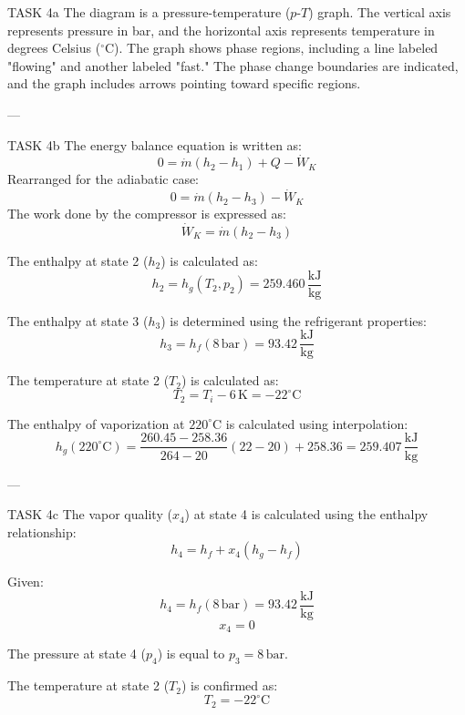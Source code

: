 TASK 4a  
The diagram is a pressure-temperature (\(p\)-\(T\)) graph. The vertical axis represents pressure in bar, and the horizontal axis represents temperature in degrees Celsius (\(^\circ\text{C}\)). The graph shows phase regions, including a line labeled "flowing" and another labeled "fast." The phase change boundaries are indicated, and the graph includes arrows pointing toward specific regions.

---

TASK 4b  
The energy balance equation is written as:  
\[
0 = \dot{m}(h_2 - h_1) + Q - \dot{W}_K
\]  
Rearranged for the adiabatic case:  
\[
0 = \dot{m}(h_2 - h_3) - \dot{W}_K
\]  
The work done by the compressor is expressed as:  
\[
\dot{W}_K = \dot{m}(h_2 - h_3)
\]  

The enthalpy at state 2 (\(h_2\)) is calculated as:  
\[
h_2 = h_g(T_2, p_2) = 259.460 \, \frac{\text{kJ}}{\text{kg}}
\]  

The enthalpy at state 3 (\(h_3\)) is determined using the refrigerant properties:  
\[
h_3 = h_f(8 \, \text{bar}) = 93.42 \, \frac{\text{kJ}}{\text{kg}}
\]  

The temperature at state 2 (\(T_2\)) is calculated as:  
\[
T_2 = T_i - 6 \, \text{K} = -22^\circ\text{C}
\]  

The enthalpy of vaporization at \(220^\circ\text{C}\) is calculated using interpolation:  
\[
h_g(220^\circ\text{C}) = \frac{260.45 - 258.36}{264 - 20} (22 - 20) + 258.36 = 259.407 \, \frac{\text{kJ}}{\text{kg}}
\]  

---

TASK 4c  
The vapor quality (\(x_4\)) at state 4 is calculated using the enthalpy relationship:  
\[
h_4 = h_f + x_4(h_g - h_f)
\]  

Given:  
\[
h_4 = h_f(8 \, \text{bar}) = 93.42 \, \frac{\text{kJ}}{\text{kg}}
\]  
\[
x_4 = 0
\]  

The pressure at state 4 (\(p_4\)) is equal to \(p_3 = 8 \, \text{bar}\).  

The temperature at state 2 (\(T_2\)) is confirmed as:  
\[
T_2 = -22^\circ\text{C}
\]  